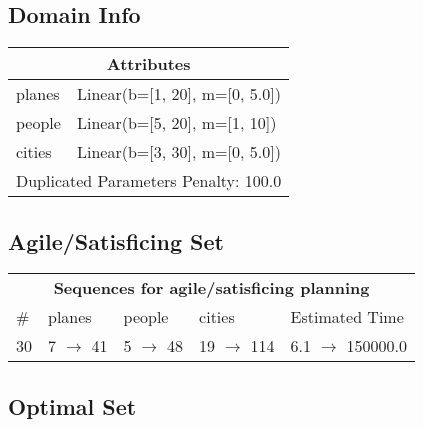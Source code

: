 \documentclass{article}
\begin{document}
                    \subsection*{Domain Info}

                    \begin{center}
                    \begin{tabular}{p{}p{}}
                    \multicolumn{2}{c}{\bf \large Attributes}\\\midrule
                    planes & Linear(b=[1, 20], m=[0, 5.0])\\
people & Linear(b=[5, 20], m=[1, 10])\\
cities & Linear(b=[3, 30], m=[0, 5.0])
                    
                     \\\midrule
                    \multicolumn{2}{l}{Duplicated Parameters Penalty: 100.0}
                    \end{tabular}
                    \end{center}
                
                         \subsection*{Agile/Satisficing Set}

                        \begin{center}
                        \begin{tabular}{l|l|l|l|l}
                        \multicolumn{5}{c}{\bf \large Sequences for agile/satisficing planning}\\
                        \# & planes & people & cities & Estimated Time\\\midrule
                        30&7 $\rightarrow$ 41&5 $\rightarrow$ 48&19 $\rightarrow$ 114&6.1 $\rightarrow$ 150000.0
                        \end{tabular}
                        \end{center}
                    
                            \subsection*{Optimal Set}
\end{document}
